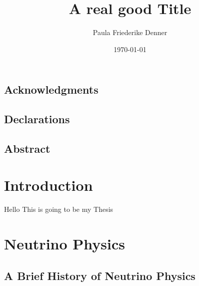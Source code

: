 \documentclass[a4paper, 11pt]{report}
\date{\today}
\author{Paula Friederike Denner}
\title{A real good Title}
\begin{document}

\thesistitlepage




\pagestyle{plain}


\tableofcontents{}


\listoffigures{}


\listoftables{}

\clearpage

\section*{Acknowledgments}


\clearpage

\section*{Declarations}


\clearpage
\null\vfill

{\centering
\section*{Abstract}
}


\vfill\vfill
\clearpage



\chapter{Introduction}


Hello This is going to be my Thesis\cite{aBook}

\chapter{Neutrino Physics}

\section{A Brief History of Neutrino Physics}

\end{document}

